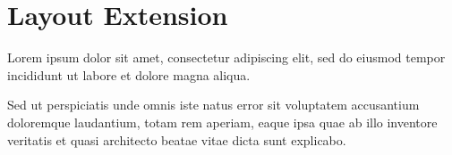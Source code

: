 
\chapter{\label{layout-extension}Layout Extension}
\begin{minipage}[t]{0.646666666667\textwidth}

\par Lorem ipsum dolor sit amet, consectetur adipiscing elit, sed do eiusmod tempor incididunt ut labore et dolore magna aliqua.
\end{minipage}
\hfill
\begin{minipage}[t]{0.313333333333\textwidth}

\par Sed ut perspiciatis unde omnis iste natus error sit voluptatem accusantium doloremque laudantium, totam rem aperiam, eaque ipsa quae ab illo inventore veritatis et quasi architecto beatae vitae dicta sunt explicabo.
\end{minipage}
